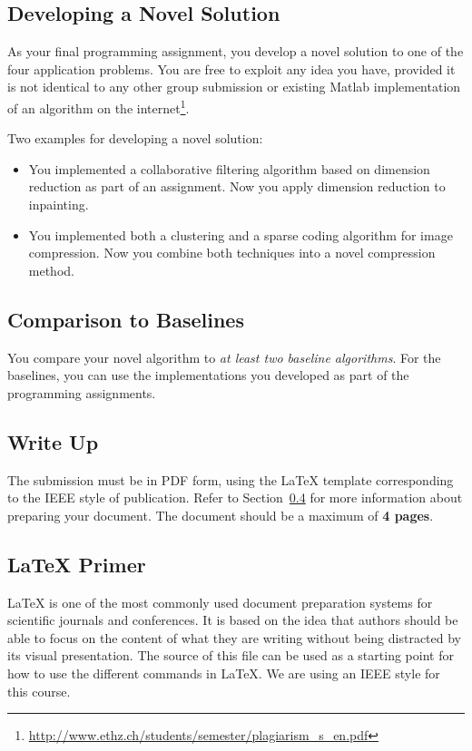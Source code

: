 \documentclass[10pt,conference,compsocconf]{IEEEtran}
\begin{document}
\subsection{Developing a Novel Solution}

As your final programming assignment, you develop a novel solution to
one of the four application problems. You are free to exploit any idea
you have, provided it is not identical to any other group submission
or existing Matlab implementation of an algorithm on the
internet\footnote{\url{http://www.ethz.ch/students/semester/plagiarism_s_en.pdf}}.

Two examples for developing a novel solution:
\begin{itemize}
\item You implemented a collaborative filtering algorithm based on
  dimension reduction as part of an assignment. Now you apply
  dimension reduction to inpainting.
\item You implemented both a clustering and a sparse coding algorithm
  for image compression. Now you combine both techniques into a novel
  compression method.
\end{itemize}

\subsection{Comparison to Baselines}

You compare your novel algorithm to \emph{at least two baseline
  algorithms}. For the baselines, you can use the implementations you
developed as part of the programming assignments.


\subsection{Write Up}

The submission must be in PDF form, using the \LaTeX{} template
corresponding to the IEEE style of publication. Refer to
Section~\ref{sec:latex-primer} for more information about preparing
your document. The document should be a maximum of {\bf 4 pages}.

\subsection{\LaTeX{} Primer}
\label{sec:latex-primer}

\LaTeX{} is one of the most commonly used document preparation systems
for scientific journals and conferences. It is based on the idea
that authors should be able to focus on the content of what they are
writing without being distracted by its visual presentation.
The source of this file can be used as a starting point for how to use
the different commands in \LaTeX{}. We are using an IEEE style for
this course.
\end{document}
